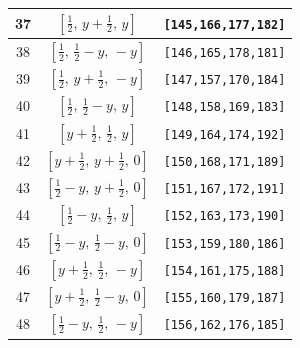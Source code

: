 \documentclass[fleqn,8pt]{jsarticle}
\begin{document}
\begin{longtable}{ccc}
37 & $\left[ \frac{1}{2},\, y + \frac{1}{2},\, y \right]$ & {\tt [145,166,177,182]} \\ \hline
38 & $\left[ \frac{1}{2},\, \frac{1}{2} - y,\, - y \right]$ & {\tt [146,165,178,181]} \\ \hline
39 & $\left[ \frac{1}{2},\, y + \frac{1}{2},\, - y \right]$ & {\tt [147,157,170,184]} \\ \hline
40 & $\left[ \frac{1}{2},\, \frac{1}{2} - y,\, y \right]$ & {\tt [148,158,169,183]} \\ \hline
41 & $\left[ y + \frac{1}{2},\, \frac{1}{2},\, y \right]$ & {\tt [149,164,174,192]} \\ \hline
42 & $\left[ y + \frac{1}{2},\, y + \frac{1}{2},\, 0 \right]$ & {\tt [150,168,171,189]} \\ \hline
43 & $\left[ \frac{1}{2} - y,\, y + \frac{1}{2},\, 0 \right]$ & {\tt [151,167,172,191]} \\ \hline
44 & $\left[ \frac{1}{2} - y,\, \frac{1}{2},\, y \right]$ & {\tt [152,163,173,190]} \\ \hline
45 & $\left[ \frac{1}{2} - y,\, \frac{1}{2} - y,\, 0 \right]$ & {\tt [153,159,180,186]} \\ \hline
46 & $\left[ y + \frac{1}{2},\, \frac{1}{2},\, - y \right]$ & {\tt [154,161,175,188]} \\ \hline
47 & $\left[ y + \frac{1}{2},\, \frac{1}{2} - y,\, 0 \right]$ & {\tt [155,160,179,187]} \\ \hline
48 & $\left[ \frac{1}{2} - y,\, \frac{1}{2},\, - y \right]$ & {\tt [156,162,176,185]} \\
\end{longtable}
\renewcommand{\arraystretch}{1.2}
\end{document}
